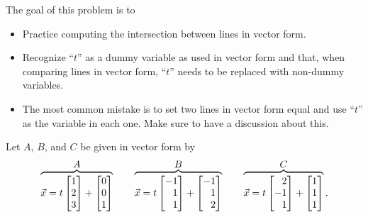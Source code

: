\documentclass{problemset}
\newcommand{\bookonlynewpage}{\begin{bookonly}\newpage\end{bookonly}}
\begin{document}
	\bookonlynewpage
	\question
	\begin{annotation}
		\begin{goals}

			The goal of this problem is to
			\begin{itemize}
				\item Practice computing the intersection between lines
					in vector form.
				\item Recognize ``$t$'' as a dummy variable as used
					in vector form and that, when comparing lines in
					vector form, ``$t$'' needs to be replaced with
					non-dummy variables.
			\end{itemize}
		\end{goals}

		\begin{notes}
			\begin{itemize}
				\item The most common mistake is to set two lines
					in vector form equal and use ``$t$'' as
					the variable in each one. Make sure to have a discussion
					about this.
			\end{itemize}
		\end{notes}
	\end{annotation}
	Let $A$, $B$, and $C$ be given in vector form by
	\[
	\overbrace{\vec x=t\mat{1\\2\\3}+\mat{0\\0\\1}}^{\displaystyle A}
	\qquad \overbrace{\vec x=t\mat{-1\\1\\1}+\mat{-1\\1\\2}}^{\displaystyle B}
	\qquad \overbrace{\vec x=t\mat{2\\-1\\1}+\mat{1\\1\\1}}^{\displaystyle C}.
	\]
\end{document}
